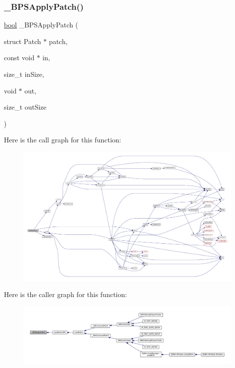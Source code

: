 \subsubsection{\texorpdfstring{\+\_\+\+B\+P\+S\+Apply\+Patch()}{\_BPSApplyPatch()}}
{\footnotesize\ttfamily \mbox{\hyperlink{libretro_8h_a4a26dcae73fb7e1528214a068aca317e}{bool}} \+\_\+\+B\+P\+S\+Apply\+Patch (\begin{DoxyParamCaption}\item[{struct Patch $\ast$}]{patch,  }\item[{const void $\ast$}]{in,  }\item[{size\+\_\+t}]{in\+Size,  }\item[{void $\ast$}]{out,  }\item[{size\+\_\+t}]{out\+Size }\end{DoxyParamCaption})\hspace{0.3cm}{\ttfamily [static]}}

Here is the call graph for this function\+:
\nopagebreak
\begin{figure}[H]
\begin{center}
\leavevmode
\includegraphics[width=350pt]{patch-ups_8c_afd9b5aebbeb07f9eb60a496daa6fe27f_cgraph}
\end{center}
\end{figure}
Here is the caller graph for this function\+:
\nopagebreak
\begin{figure}[H]
\begin{center}
\leavevmode
\includegraphics[width=350pt]{patch-ups_8c_afd9b5aebbeb07f9eb60a496daa6fe27f_icgraph}
\end{center}
\end{figure}
\mbox{\label{patch-ups_8c_a44bc66fd8a8882bf88756a2e00a48af1}} 
